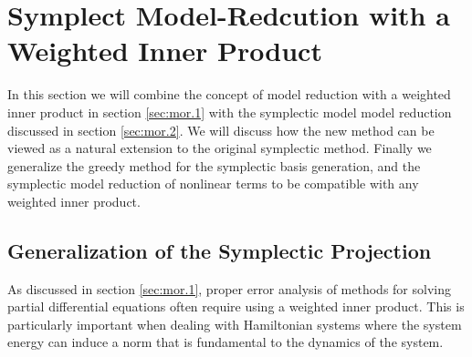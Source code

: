 \section{Symplect Model-Redcution with a Weighted Inner Product} \label{sec:normmor}

In this section we will combine the concept of model reduction with a weighted inner product in section \ref{sec:mor.1} with the symplectic model model reduction discussed in section \ref{sec:mor.2}. We will discuss how the new method can be viewed as a natural extension to the original symplectic method. Finally we generalize the greedy method for the symplectic basis generation, and the symplectic model reduction of nonlinear terms to be compatible with any weighted inner product.

\subsection{Generalization of the Symplectic Projection} \label{sec:normmor.1}
As discussed in section \ref{sec:mor.1}, proper error analysis of methods for solving partial differential equations often require using a weighted inner product. This is particularly important when dealing with Hamiltonian systems where the system energy can induce a norm that is fundamental to the dynamics of the system.

